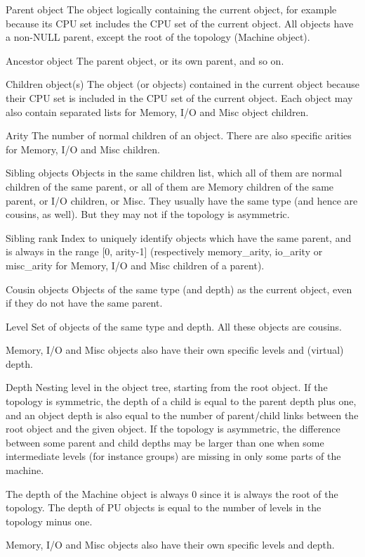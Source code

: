\begin{DoxyDescription}
\item[Parent object ]The object logically containing the current object, for example because its C\+PU set includes the C\+PU set of the current object. All objects have a non-\/\+N\+U\+LL parent, except the root of the topology (Machine object). 


\item[Ancestor object ]The parent object, or its own parent, and so on.


\item[Children object(s) ]The object (or objects) contained in the current object because their C\+PU set is included in the C\+PU set of the current object. Each object may also contain separated lists for Memory, I/O and Misc object children. 


\item[Arity ]The number of normal children of an object. There are also specific arities for Memory, I/O and Misc children. 


\item[Sibling objects ]Objects in the same children list, which all of them are normal children of the same parent, or all of them are Memory children of the same parent, or I/O children, or Misc. They usually have the same type (and hence are cousins, as well). But they may not if the topology is asymmetric. 


\item[Sibling rank ]Index to uniquely identify objects which have the same parent, and is always in the range \mbox{[}0, arity-\/1\mbox{]} (respectively memory\+\_\+arity, io\+\_\+arity or misc\+\_\+arity for Memory, I/O and Misc children of a parent).


\item[Cousin objects ]Objects of the same type (and depth) as the current object, even if they do not have the same parent.


\item[Level ]Set of objects of the same type and depth. All these objects are cousins.

Memory, I/O and Misc objects also have their own specific levels and (virtual) depth. 


\item[Depth ]Nesting level in the object tree, starting from the root object. If the topology is symmetric, the depth of a child is equal to the parent depth plus one, and an object depth is also equal to the number of parent/child links between the root object and the given object. If the topology is asymmetric, the difference between some parent and child depths may be larger than one when some intermediate levels (for instance groups) are missing in only some parts of the machine.

The depth of the Machine object is always 0 since it is always the root of the topology. The depth of PU objects is equal to the number of levels in the topology minus one.

Memory, I/O and Misc objects also have their own specific levels and depth. 


\end{DoxyDescription}

